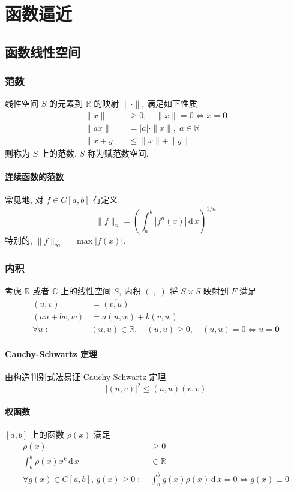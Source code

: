 \documentclass{ctexart}
\newcommand{\Rset}{\mathbb{R}}
\newcommand{\Cset}{\mathbb{C}}
\newcommand{\ud}{\,\mathrm{d}\,}
\begin{document}
\section{函数逼近}
\subsection{函数线性空间}
\subsubsection{范数}
    线性空间 $S$ 的元素到 $\Rset$ 的映射 $\|\cdot\|$, 满足如下性质 \begin{align*}
        \| x \| & \ge 0,\quad \|x\| = 0 \Leftrightarrow x = \mathbf{0}\\
        \|ax\| &= |a| \cdot \|x\|,\; a \in \Rset\\
        \|x+y\| &\le \|x\| + \|y\|
    \end{align*} 则称为 $S$ 上的范数. $S$ 称为赋范数空间.\par
\paragraph{连续函数的范数}
    常见地, 对 $f \in C[a,b]$ 有定义 \[
        \| f \|_n = \left(\int_a^b |f^n(x)| \ud x\right)^{1/n}\]
    特别的, $\|f\|_{\infty} = \max |f(x)|$.

\subsubsection{内积}
    考虑 $\Rset$ 或者 $\Cset$ 上的线性空间 $S$,
    内积 $(\cdot, \cdot)$ 将 $S\times S$ 映射到 $F$ 满足
    \begin{align*}
        (u,v) &= \overline{(v,u)}\\
        (au+bv, w) &= a(u,w) + b(v,w)\\
        \forall u\;:\;&(u,u) \in \Rset,\quad (u,u) \ge 0,\quad (u,u) = 0 \Leftrightarrow u = \mathbf{0}
    \end{align*}
\paragraph{Cauchy-Schwartz 定理}
    由构造判别式法易证 Cauchy-Schwartz 定理 \[
        |(u,v)|^2 \le (u,u)(v,v)\]
\paragraph{权函数}
    $[a,b]$ 上的函数 $\rho(x)$ 满足 \begin{align*}
        \rho(x) &\ge 0\\
        \int_a^b \rho(x) x^k \ud x &\in \Rset\\
        \forall g(x) \in C[a,b],\,g(x)\ge 0\;:\;&
            \int_a^b g(x)\rho(x) \ud x = 0 \Leftrightarrow g(x) \equiv 0
    \end{align*}
\end{document}
